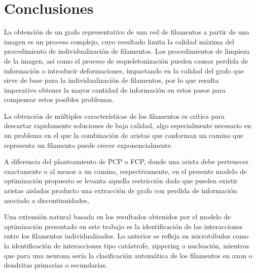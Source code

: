 \chapter{Conclusiones}
\label{chap:conclu}
La obtenci\'on de un grafo representativo de una red de filamentos a partir de una imagen es un proceso complejo, cuyo resultado limita la calidad m\'axima del procedimiento de individualizaci\'on de filamentos. Los procedimientos de limpieza de la imagen, as\'i como el proceso de esqueletonizaci\'on pueden causar perdida de informaci\'on o introducir deformaciones, impactando en la calidad del grafo que sirve de base para la individualizaci\'on de filamentos, por lo que resulta imperativo obtener la mayor cantidad de informaci\'on en estos pasos para compensar estos posibles problemas. 

La obtenci\'on de m\'ultiples caracter\'isticas de los filamentos es cr\'itica para descartar rapidamente soluciones de baja calidad, algo especialmente necesario en un problema en el que la combinaci\'on de aristas que conforman un camino que representa un filamento puede crecer exponencialmente.



A diferencia del planteamiento de PCP o FCP, donde una arista debe pertenecer exactamente o al menos a un camino, respectivamente, en el presente modelo de optimizaci\'on propuesto se levanta aquella restricci\'on dado que pueden existir aristas aisladas producto una extracci\'on de grafo con perdida de informaci\'on asociado a discontinuidades,


Una extensi\'on natural basada en los resultados obtenidos por el modelo de optimizaci\'on presentado en este trabajo es la identificaci\'on de las interacciones entre los filamentos individualizados. Lo anterior se refleja en microt\'ubulos como la identificaci\'on de interacciones tipo cat\'astrofe, zippering o nucleaci\'on, mientras que para una neurona ser\'ia la clasificaci\'on autom\'atica de los filamentos en axon o dendritas primarias o secundarias. 
